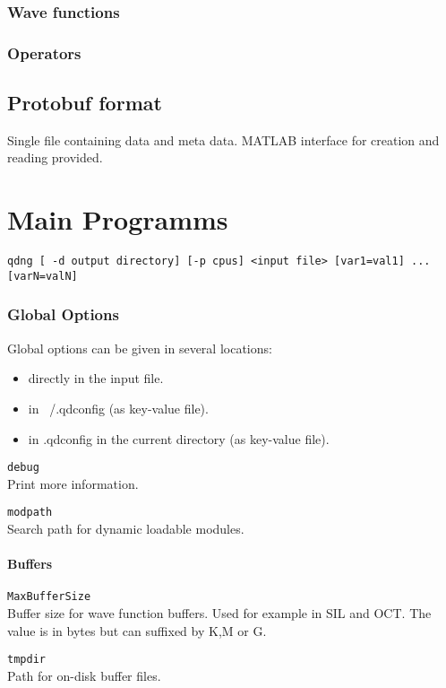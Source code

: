 \documentclass[a4paper,12pt]{scrbook}
\newcommand{\option}[2]{\item \texttt{#1}\\ #2}
\begin{document}
\subsection{Wave functions}

\subsection{Operators}

\section{Protobuf format}
Single file containing data and meta data.
MATLAB interface for creation and reading provided.


\chapter{Main Programms}

\begin{verbatim}
qdng [ -d output directory] [-p cpus] <input file> [var1=val1] ... [varN=valN] 
\end{verbatim}

\subsection{Global Options}
Global options can be given in several locations:
\begin{itemize}
 \item directly in the input file.
 \item in ~/.qdconfig (as key-value file).
 \item in .qdconfig in the current directory (as key-value file).
\end{itemize}

\begin{options}
 \option{debug}{Print more information.}
 \option{modpath}{Search path for dynamic loadable modules.}
\end{options} 

\subsubsection{Buffers}
\begin{options}
 \option{MaxBufferSize}{Buffer size for wave function buffers. Used for example in SIL and OCT. The value is in bytes but
 can suffixed by K,M or G.}
 \option{tmpdir}{Path for on-disk buffer files.}
\end{options}
\end{document}
